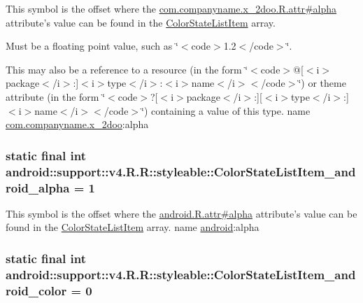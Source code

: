 This symbol is the offset where the \hyperlink{classcom_1_1companyname_1_1x__2doo_1_1_r_1_1attr_da10ad1a9a8bf2498c223cc9bf101935}{com.companyname.x\_\-2doo.R.attr\#alpha} attribute's value can be found in the \hyperlink{classandroid_1_1support_1_1v4_1_1_r_1_1styleable_47476cf7ffe4d9c8245bd3670938eac6}{ColorStateListItem} array.

Must be a floating point value, such as \char`\"{}$<$code$>$1.2$<$/code$>$\char`\"{}. 

This may also be a reference to a resource (in the form \char`\"{}$<$code$>$@\mbox{[}$<$i$>$package$<$/i$>$:\mbox{]}$<$i$>$type$<$/i$>$:$<$i$>$name$<$/i$>$$<$/code$>$\char`\"{}) or theme attribute (in the form \char`\"{}$<$code$>$?\mbox{[}$<$i$>$package$<$/i$>$:\mbox{]}\mbox{[}$<$i$>$type$<$/i$>$:\mbox{]}$<$i$>$name$<$/i$>$$<$/code$>$\char`\"{}) containing a value of this type.  name \hyperlink{namespacecom_1_1companyname_1_1x__2doo}{com.companyname.x\_\-2doo}:alpha \hypertarget{classandroid_1_1support_1_1v4_1_1_r_1_1styleable_022a829047dedadde86b69a4e39c03b9}{
\subsubsection[{ColorStateListItem\_\-android\_\-alpha}]{\setlength{\rightskip}{0pt plus 5cm}static final int android::support::v4.R.R::styleable::ColorStateListItem\_\-android\_\-alpha = 1}}
\label{classandroid_1_1support_1_1v4_1_1_r_1_1styleable_022a829047dedadde86b69a4e39c03b9}


This symbol is the offset where the \hyperlink{}{android.R.attr\#alpha} attribute's value can be found in the \hyperlink{classandroid_1_1support_1_1v4_1_1_r_1_1styleable_47476cf7ffe4d9c8245bd3670938eac6}{ColorStateListItem} array.  name \hyperlink{namespaceandroid}{android}:alpha \hypertarget{classandroid_1_1support_1_1v4_1_1_r_1_1styleable_b79c06c660ce3527b4a6be6d89f1f6c4}{
\subsubsection[{ColorStateListItem\_\-android\_\-color}]{\setlength{\rightskip}{0pt plus 5cm}static final int android::support::v4.R.R::styleable::ColorStateListItem\_\-android\_\-color = 0}}
\label{classandroid_1_1support_1_1v4_1_1_r_1_1styleable_b79c06c660ce3527b4a6be6d89f1f6c4}


